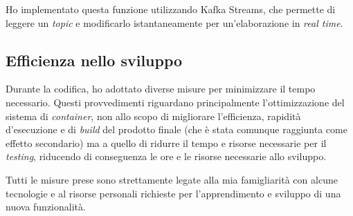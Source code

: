 Ho implementato questa funzione utilizzando Kafka Streams, che permette di leggere un \textit{topic} e modificarlo istantaneamente per un'elaborazione in \textit{real time}.

\subsection{Efficienza nello sviluppo}

Durante la codifica, ho adottato diverse misure per minimizzare il tempo necessario.
Questi provvedimenti riguardano principalmente l'ottimizzazione del sistema di \textit{container}, non allo scopo di migliorare l'efficienza, rapidità d'esecuzione e di \textit{build} del prodotto finale (che è stata comunque raggiunta come effetto secondario) ma a quello di ridurre il tempo e risorse necessarie per il \textit{testing}, riducendo di conseguenza le ore e le risorse necessarie allo sviluppo.

Tutti le misure prese sono strettamente legate alla mia famigliarità con alcune tecnologie e al risorse personali richieste per l'apprendimento e sviluppo di una nuova funzionalità.

